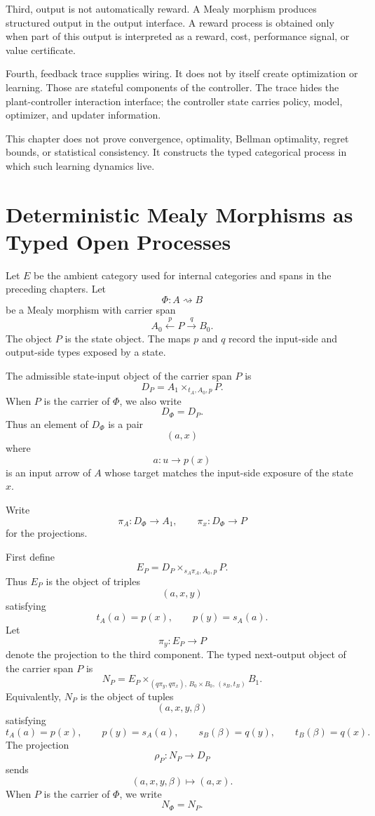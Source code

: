 Third, output is not automatically reward.  A Mealy morphism produces structured output in the
output interface.  A reward process is obtained only when part of this output is interpreted as a
reward, cost, performance signal, or value certificate.

Fourth, feedback trace supplies wiring.  It does not by itself create optimization or learning.
Those are stateful components of the controller.  The trace hides the plant-controller interaction
interface; the controller state carries policy, model, optimizer, and updater information.

This chapter does not prove convergence, optimality, Bellman optimality, regret bounds, or
statistical consistency.  It constructs the typed categorical process in which such learning
dynamics live.

\section{Deterministic Mealy Morphisms as Typed Open Processes}
\label{sec:deterministic-mealy-process-presentation}

Let \(E\) be the ambient category used for internal categories and spans in the preceding chapters.
Let
\[
\Phi:A\rightsquigarrow B
\]
be a Mealy morphism with carrier span
\[
A_0 \xleftarrow{p} P \xrightarrow{q} B_0 .
\]
The object \(P\) is the state object.  The maps \(p\) and \(q\) record the input-side and
output-side types exposed by a state.

\begin{definition}
\label{def:admissible-state-input-object}
The admissible state-input object of the carrier span \(P\) is
\[
D_P
=
A_1\times_{t_A,A_0,p}P .
\]
When \(P\) is the carrier of \(\Phi\), we also write
\[
D_\Phi=D_P .
\]
Thus an element of \(D_\Phi\) is a pair
\[
(a,x)
\]
where
\[
a:u\to p(x)
\]
is an input arrow of \(A\) whose target matches the input-side exposure of the state \(x\).
\end{definition}

Write
\[
\pi_A:D_\Phi\to A_1,
\qquad
\pi_x:D_\Phi\to P
\]
for the projections.

\begin{definition}
\label{def:typed-next-output-object}
First define
\[
E_P
=
D_P
\times_{s_A\pi_A,A_0,p}
P .
\]
Thus \(E_P\) is the object of triples
\[
(a,x,y)
\]
satisfying
\[
t_A(a)=p(x),
\qquad
p(y)=s_A(a).
\]
Let
\[
\pi_y:E_P\to P
\]
denote the projection to the third component.  The typed next-output object of the carrier span
\(P\) is
\[
N_P
=
E_P
\times_{(q\pi_y,q\pi_x),\,B_0\times B_0,\,(s_B,t_B)}
B_1 .
\]
Equivalently, \(N_P\) is the object of tuples
\[
(a,x,y,\beta)
\]
satisfying
\[
t_A(a)=p(x),
\qquad
p(y)=s_A(a),
\qquad
s_B(\beta)=q(y),
\qquad
t_B(\beta)=q(x).
\]
The projection
\[
\rho_P:N_P\to D_P
\]
sends
\[
(a,x,y,\beta)\longmapsto(a,x).
\]
When \(P\) is the carrier of \(\Phi\), we write
\[
N_\Phi=N_P .
\]
\end{definition}

